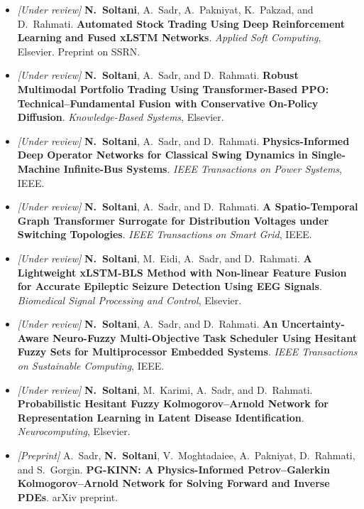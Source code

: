 \documentclass[11pt,a4paper]{article}
\begin{document}
\begin{itemize}
  \item {\color{maroon}\textit{[Under review]}}
    \textbf{N.~Soltani}, A.~Sadr, A.~Pakniyat, K.~Pakzad, and D.~Rahmati.
    {\color{navy}\textbf{Automated Stock Trading Using Deep Reinforcement Learning and Fused xLSTM Networks}}.
    \textit{Applied Soft Computing}, Elsevier. Preprint on SSRN.

  \item {\color{maroon}\textit{[Under review]}}
    \textbf{N.~Soltani}, A.~Sadr, and D.~Rahmati.
    {\color{navy}\textbf{Robust Multimodal Portfolio Trading Using Transformer-Based PPO: Technical--Fundamental Fusion with Conservative On-Policy Diffusion}}.
    \textit{Knowledge-Based Systems}, Elsevier.

  \item {\color{maroon}\textit{[Under review]}}
    \textbf{N.~Soltani}, A.~Sadr, and D.~Rahmati.
    {\color{navy}\textbf{Physics-Informed Deep Operator Networks for Classical Swing Dynamics in Single-Machine Infinite-Bus Systems}}.
    \textit{IEEE Transactions on Power Systems}, IEEE.

  \item {\color{maroon}\textit{[Under review]}}
    \textbf{N.~Soltani}, A.~Sadr, and D.~Rahmati.
    {\color{navy}\textbf{A Spatio-Temporal Graph Transformer Surrogate for Distribution Voltages under Switching Topologies}}.
    \textit{IEEE Transactions on Smart Grid}, IEEE.

  \item {\color{maroon}\textit{[Under review]}}
    \textbf{N.~Soltani}, M.~Eidi, A.~Sadr, and D.~Rahmati.
    {\color{navy}\textbf{A Lightweight xLSTM-BLS Method with Non-linear Feature Fusion for Accurate Epileptic Seizure Detection Using EEG Signals}}.
    \textit{Biomedical Signal Processing and Control}, Elsevier.

  \item {\color{maroon}\textit{[Under review]}}
    \textbf{N.~Soltani}, A.~Sadr, and D.~Rahmati.
    {\color{navy}\textbf{An Uncertainty-Aware Neuro-Fuzzy Multi-Objective Task Scheduler Using Hesitant Fuzzy Sets for Multiprocessor Embedded Systems}}.
    \textit{IEEE Transactions on Sustainable Computing}, IEEE.

  \item {\color{maroon}\textit{[Under review]}}
    \textbf{N.~Soltani}, M.~Karimi, A.~Sadr, and D.~Rahmati.
    {\color{navy}\textbf{Probabilistic Hesitant Fuzzy Kolmogorov--Arnold Network for Representation Learning in Latent Disease Identification}}.
    \textit{Neurocomputing}, Elsevier.
  \item {\color{maroon}\textit{[Preprint]}}
    A.~Sadr, \textbf{N.~Soltani}, V.~Moghtadaiee, A.~Pakniyat, D.~Rahmati, and S.~Gorgin.
    {\color{navy}\textbf{PG-KINN: A Physics-Informed Petrov--Galerkin Kolmogorov--Arnold Network for Solving Forward and Inverse PDEs}}.
    arXiv preprint.
\end{itemize}
\end{document}
